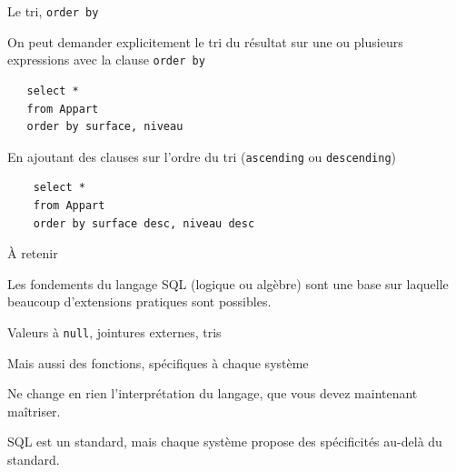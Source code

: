 \begin{frame}[fragile]{Le tri, \texttt{order by}}

On peut demander explicitement le tri du résultat sur
une ou plusieurs expressions avec la clause \texttt{order by}

\vfill


\begin{verbatim}
   select *  
   from Appart 
   order by surface, niveau
\end{verbatim}

\vfill

En ajoutant des clauses sur l'ordre du tri (\texttt{ascending} ou \texttt{descending})

\vfill

\begin{verbatim}
    select *  
    from Appart 
    order by surface desc, niveau desc
\end{verbatim}

\end{frame}
\begin{frame}{À retenir}

Les fondements du langage SQL (logique ou algèbre) sont une base sur laquelle
beaucoup d'extensions pratiques sont possibles.

\vfill

\begin{redbullet}
   \item Valeurs à \texttt{null}, jointures externes, tris
  \item  Mais aussi des fonctions, spécifiques à chaque système
  \item Ne change en rien \alert{l'interprétation} du langage, que vous devez maintenant maîtriser.
\end{redbullet}

\vfill
\begin{blocgauche}
SQL est un standard, mais chaque système propose des spécificités au-delà du standard.
\end{blocgauche}
\end{frame}

